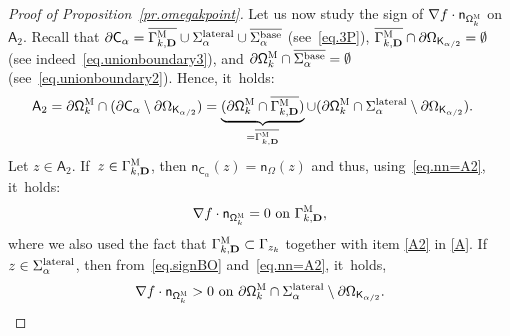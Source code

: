 \documentclass[JEP,XML,SOM,Unicode,NoEqCountersInSection,NoFloatCountersInSection,published]{cedram}
\newcommand{\mbf}[1]{\mathbf{#1}}
\let\pa\partial
\theoremstyle{plain}
\theoremstyle{definition}
\begin{document}
\begin{proof}[Proof of Proposition~\ref{pr.omegakpoint}]
Let us now study the sign of $\nabla f\cdot \mathsf n_{ \mathsf \Omega_k^{\textsc{M}}}$ on $\mathsf A_2$.
Recall that $\pa \mathsf C_\alpha = \overline{\Gamma_{k,\mbf D}^{\textsc{M}} }\cup { \Sigma_\alpha^{\textup{lateral}} }\cup \overline{ \Sigma_\alpha^{\textup{base}}}$ (see~\eqref{eq.3P}), $\overline{\Gamma_{k,\mbf D}^{\textsc{M}} } \cap \partial \Omega_{\mathsf K_{\alpha/2}} =\emptyset$ (see indeed~\eqref{eq.unionboundary3}), and $\pa \mathsf \Omega_k^{\textsc{M}} \cap \overline{ \Sigma_\alpha^{\textup{base}}}=\emptyset$ (see~\eqref{eq.unionboundary2}). Hence, it~holds:
\begin{align}\label{eq.=A2}
\mathsf A_2=\pa \mathsf \Omega_k^{\textsc{M}}\cap (\pa \mathsf C_\alpha \setminus \partial \Omega_{\mathsf K_{\alpha/2}}) &=\underbrace{(\pa \mathsf \Omega_k^{\textsc{M}} \cap \overline{\Gamma_{k,\mbf D}^{\textsc{M}} })}_{=\overline{\Gamma_{k,\mbf D}^{\textsc{M}} }} \cup (\pa \mathsf \Omega_k^{\textsc{M}} \cap {\Sigma_\alpha^{\textup{lateral}} }\setminus \partial \Omega_{\mathsf K_{\alpha/2}}).
\end{align}
Let $z\in \mathsf A_2$. If~$z\in \Gamma_{k,\mbf D}^{\textsc{M}} $, then $ \mathsf n_{ \mathsf C_\alpha}(z) =\mathsf n_\Omega(z)$ and thus, using~\eqref{eq.nn=A2}, it~holds:
\begin{equation}\label{eq.panf2}
\nabla f\cdot \mathsf n_{ \mathsf \Omega_k^{\textsc{M}}}=0\text{ on } {\Gamma_{k,\mbf D}^{\textsc{M}} },
\end{equation}
where we also used the fact that $\Gamma_{k,\mbf D}^{\textsc{M}} \subset \Gamma_{z_k}$ together with item \eqref{A2} in \ref{A}. If~$z\in \Sigma_\alpha^{\textup{lateral}}$, then from~\eqref{eq.signBO} and~\eqref{eq.nn=A2}, it~holds,
\begin{equation}\label{eq.panf3}
\nabla f\cdot \mathsf n_{ \mathsf \Omega_k^{\textsc{M}}}>0\text{ on }\pa \mathsf \Omega_k^{\textsc{M}} \cap {\Sigma_\alpha^{\textup{lateral}} }\setminus \partial \Omega_{\mathsf K_{\alpha/2}}.
\end{equation}


\end{proof}
\end{document}
